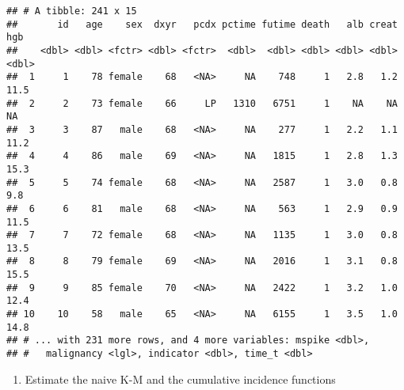 \documentclass[]{book}
\providecommand{\tightlist}{%
  \setlength{\itemsep}{0pt}\setlength{\parskip}{0pt}}
\theoremstyle{definition}
\theoremstyle{definition}
\theoremstyle{definition}
\theoremstyle{remark}
\begin{document}
\begin{verbatim}
## # A tibble: 241 x 15
##       id   age    sex  dxyr   pcdx pctime futime death   alb creat   hgb
##    <dbl> <dbl> <fctr> <dbl> <fctr>  <dbl>  <dbl> <dbl> <dbl> <dbl> <dbl>
##  1     1    78 female    68   <NA>     NA    748     1   2.8   1.2  11.5
##  2     2    73 female    66     LP   1310   6751     1    NA    NA    NA
##  3     3    87   male    68   <NA>     NA    277     1   2.2   1.1  11.2
##  4     4    86   male    69   <NA>     NA   1815     1   2.8   1.3  15.3
##  5     5    74 female    68   <NA>     NA   2587     1   3.0   0.8   9.8
##  6     6    81   male    68   <NA>     NA    563     1   2.9   0.9  11.5
##  7     7    72 female    68   <NA>     NA   1135     1   3.0   0.8  13.5
##  8     8    79 female    69   <NA>     NA   2016     1   3.1   0.8  15.5
##  9     9    85 female    70   <NA>     NA   2422     1   3.2   1.0  12.4
## 10    10    58   male    65   <NA>     NA   6155     1   3.5   1.0  14.8
## # ... with 231 more rows, and 4 more variables: mspike <dbl>,
## #   malignancy <lgl>, indicator <dbl>, time_t <dbl>
\end{verbatim}

\begin{enumerate}
\def\labelenumi{\arabic{enumi}.}
\setcounter{enumi}{3}
\tightlist
\item
  Estimate the naive K-M and the cumulative incidence functions
\end{enumerate}
\end{document}

